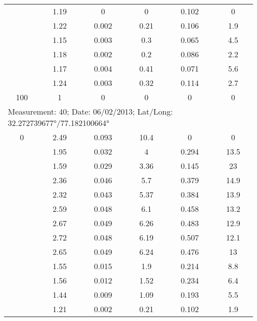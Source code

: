 \begin{longtable}{cccccc}
		& 1.19  & 0     & 0     & 0.102 & 0 \\
		
		& 1.22  & 0.002 & 0.21  & 0.106 & 1.9 \\
		
		& 1.15  & 0.003 & 0.3   & 0.065 & 4.5 \\
		
		& 1.18  & 0.002 & 0.2   & 0.086 & 2.2 \\
		
		& 1.17  & 0.004 & 0.41  & 0.071 & 5.6 \\
		
		& 1.24  & 0.003 & 0.32  & 0.114 & 2.7 \\
		
		100   & 1     & 0     & 0     & 0     & 0  \\
		\midrule
		
		\multicolumn{6}{l}{Measurement: 40; Date: 06/02/2013;
			Lat/Long: 32.272739677°/77.182100664°} \\		
		\midrule
		0     & 2.49  & 0.093 & 10.4  & 0     & 0 \\
		
		& 1.95  & 0.032 & 4     & 0.294 & 13.5 \\
		
		& 1.59  & 0.029 & 3.36  & 0.145 & 23 \\
		
		& 2.36  & 0.046 & 5.7   & 0.379 & 14.9 \\
		
		& 2.32  & 0.043 & 5.37  & 0.384 & 13.9 \\
		
		& 2.59  & 0.048 & 6.1   & 0.458 & 13.2 \\
		
		& 2.67  & 0.049 & 6.26  & 0.483 & 12.9 \\
		
		& 2.72  & 0.048 & 6.19  & 0.507 & 12.1 \\
		
		& 2.65  & 0.049 & 6.24  & 0.476 & 13 \\
		
		& 1.55  & 0.015 & 1.9   & 0.214 & 8.8 \\
		
		& 1.56  & 0.012 & 1.52  & 0.234 & 6.4 \\
		
		& 1.44  & 0.009 & 1.09  & 0.193 & 5.5 \\
		
		& 1.21  & 0.002 & 0.21  & 0.102 & 1.9 \\
		

\end{longtable}
